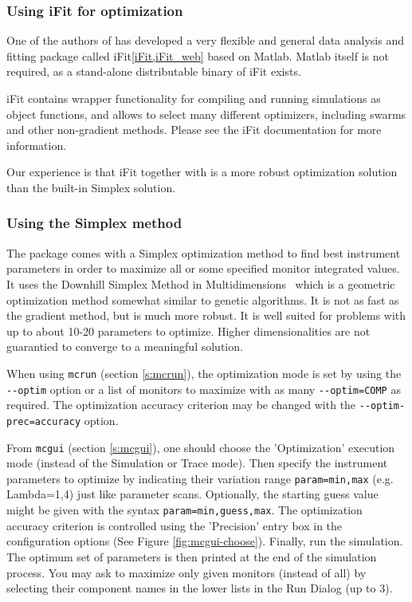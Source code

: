 \subsubsection{Using iFit for optimization}

One of the authors of \MCS has developed a very flexible and general data
analysis and fitting package called iFit\ref{iFit,iFit_web} based on
Matlab. Matlab itself is not required, as a stand-alone distributable binary of
iFit exists.

iFit contains wrapper functionality for compiling and running \MCS simulations
as object functions, and allows to select many different optimizers, including
swarms and other non-gradient methods. Please see the iFit documentation for
more information.

Our experience is that iFit together with \MCS is a more robust optimization
solution than the \MCS built-in Simplex solution.

\subsubsection{Using the Simplex method}

The \MCS package comes with a Simplex optimization method to find best
instrument parameters in order to maximize all or some specified monitor
integrated values. It uses the Downhill Simplex Method in
Multidimensions~\cite{neldermead,NumRecip} which is a geometric optimization
method somewhat similar to genetic algorithms. It is not as fast as the gradient
method, but is much more robust. It is well suited for problems with up to about
10-20 parameters to optimize. Higher dimensionalities are not guarantied to
converge to a meaningful solution.

When using \verb+mcrun+ (section \ref{s:mcrun}), the optimization mode is set by
using the \verb+--optim+ option or a list of monitors to maximize with as many
\verb+--optim=COMP+ as required. The optimization accuracy criterion may be
changed with the \verb+--optim-prec=accuracy+ option.

From \verb+mcgui+ (section \ref{s:mcgui}), one should choose the 'Optimization'
execution mode (instead of the Simulation or Trace mode). Then specify the
instrument parameters to optimize by indicating their variation range
\verb+param=min,max+ (e.g. Lambda=1,4) just like parameter scans. Optionally,
the starting guess value might be given with the syntax
\verb+param=min,guess,max+. The optimization accuracy criterion is controlled
using the 'Precision' entry box in the configuration options (See Figure
\ref{fig:mcgui-choose}). Finally, run the simulation. The optimum set of
parameters is then printed at the end of the simulation process. You may ask to
maximize only given monitors (instead of all) by selecting their component names
in the lower lists in the Run Dialog (up to 3).

